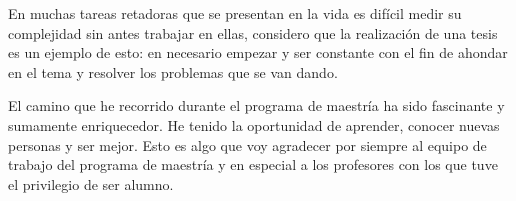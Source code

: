 En muchas tareas retadoras que se presentan en la vida es difícil medir su complejidad sin antes trabajar en ellas, considero que la realización de una tesis es un ejemplo de esto: en necesario empezar y ser constante con el fin de ahondar en el tema y resolver los problemas que se van dando.

El camino que he recorrido durante el programa de maestría ha sido fascinante y sumamente enriquecedor. He tenido la oportunidad de aprender, conocer nuevas personas y ser mejor. Esto es algo que voy agradecer por siempre al equipo de trabajo del programa de maestría y en especial a los profesores con los que tuve el privilegio de ser alumno.
